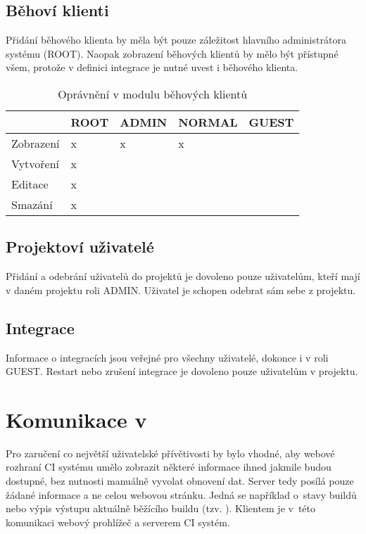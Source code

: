 \subsection{Běhoví klienti}

Přidání běhového klienta by měla být pouze záležitost hlavního administrátora systému (ROOT).
Naopak zobrazení běhových klientů by mělo být přístupné všem, protože v definici integrace je nutné uvest i běhového klienta.

\begin{table}[h]
\centering
\caption{Oprávnění v modulu běhových klientů}
\begin{tabular}{|l|l|l|l|l|}
\hline
       & ROOT & ADMIN & NORMAL & GUEST \\ \hline
Zobrazení   & x    & x     & x      &       \\ \hline
Vytvoření & x    &       &        &       \\ \hline
Editace   & x    &       &        &       \\ \hline
Smazání & x    &       &        &      \\ \hline
\end{tabular}
\end{table}

\subsection{Projektoví uživatelé}

Přidání a odebrání uživatelů do projektů je dovoleno pouze uživatelům, kteří mají v daném projektu roli ADMIN.
Uživatel je schopen odebrat sám sebe z projektu.

\subsection{Integrace}

Informace o integracích jsou veřejné pro všechny uživatelé, dokonce i v roli GUEST.
Restart nebo zrušení integrace je dovoleno pouze uživatelům v projektu.

\section{Komunikace v }

Pro zaručení co největší uživatelské přívětivosti by bylo vhodné, aby webové rozhraní CI systému umělo zobrazit některé informace ihned jakmile budou dostupné, bez nutnosti manuálně vyvolat obnovení dat.
Server tedy posílá pouze žádané informace a ne celou webovou stránku.
Jedná se například o~stavy buildů nebo výpis výstupu aktuálně běžícího buildu (tzv. ).
Klientem je v~této komunikaci webový prohlížeč a serverem CI systém.


